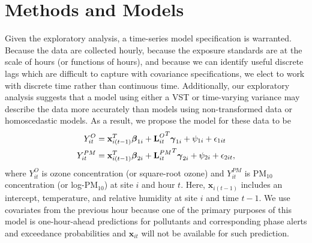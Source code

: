\documentclass[alpha-refs]{wiley-article}
\newcommand{\bbeta}{ \mbox{\boldmath $ \beta $} }
\newcommand{\bgamma}{ \mbox{\boldmath $\gamma$} }
\newcommand{\bL}{\textbf{L}}
\newcommand{\bx}{\textbf{x}}
\begin{document}
\section{Methods and Models}\label{sec:model}

Given the exploratory analysis, a time-series model specification is warranted. Because the data are collected hourly, because the exposure standards are at the scale of hours (or functions of hours), and because we can identify useful discrete lags which are difficult to capture with covariance specifications, we elect to work with discrete time rather than continuous time.
Additionally, our exploratory analysis suggests that a model using either a VST or time-varying variance may describe the data more accurately than models using non-transformed data or homoscedastic models. As a result, we propose the model for these data to be
\begin{align}\label{eq:mod3a}
Y^{O}_{it} &= \bx_{i(t-1)}^T \bbeta_{1i} + {\bL^{O}_{it}}^T\bgamma_{1i}+ \psi_{1i} + \epsilon_{1it} \\
Y^{PM}_{it} &= \bx_{i(t-1)}^T \bbeta_{2i}+ {\bL^{PM}_{it}}^T\bgamma_{2i} + \psi_{2i} + \epsilon_{2it} , \nonumber
\end{align}
where $Y^{O}_{it}$ is ozone concentration (or square-root ozone)
and $Y^{PM}_{it}$ is $\text{PM}_{10}$ concentration (or log-$\text{PM}_{10}$) at site $i$ and hour $t$.
Here, $\bx_{i(t-1)}$ includes an intercept, temperature, and relative humidity at site $i$ and time $t-1$. We use covariates from the previous hour because one of the primary purposes of this model is one-hour-ahead predictions for pollutants and corresponding phase alerts and exceedance probabilities and $\bx_{it}$ will not be available for such prediction.
\end{document}
